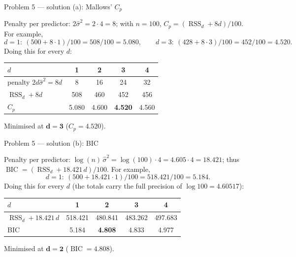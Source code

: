 \documentclass[aspectratio=169,11pt]{beamer}
\begin{document}
\begin{frame}{Problem 5 --- solution (a): Mallows' $C_p$}
  \begin{solutionbox}
    Penalty per predictor: $2\hat{\sigma}^2=2\cdot 4=8$; with $n=100$,
    $C_p=(\operatorname{RSS}_d+8d)/100$. For example,
    \[
      d=1:\ (500+8\cdot 1)/100=508/100=\mathbf{5.080},\qquad
      d=3:\ (428+8\cdot 3)/100=452/100=\mathbf{4.520}.
    \]
    Doing this for every $d$:
    \begin{center}
    \begin{tabular}{lcccc}
      \toprule
      $d$ & 1 & 2 & 3 & 4\\
      \midrule
      penalty $2d\hat{\sigma}^2=8d$ & 8 & 16 & 24 & 32\\
      $\operatorname{RSS}_d+8d$ & 508 & 460 & 452 & 456\\
      $C_p$ & 5.080 & 4.600 & \textbf{4.520} & 4.560\\
      \bottomrule
    \end{tabular}
    \end{center}
    Minimised at $\mathbf{d=3}$ ($C_p=4.520$).
  \end{solutionbox}
\end{frame}

\begin{frame}{Problem 5 --- solution (b): BIC}
  \begin{solutionbox}
    Penalty per predictor: $\log(n)\,\hat{\sigma}^2=\log(100)\cdot 4=4.605\cdot 4=18.421$;
    thus $\operatorname{BIC}=(\operatorname{RSS}_d+18.421\,d)/100$. For example,
    \[
      d=1:\ (500+18.421\cdot 1)/100=518.421/100=\mathbf{5.184}.
    \]
    Doing this for every $d$ (the totals carry the full precision of $\log 100=4.60517$):
    \begin{center}
    \begin{tabular}{lcccc}
      \toprule
      $d$ & 1 & 2 & 3 & 4\\
      \midrule
      $\operatorname{RSS}_d+18.421\,d$ & 518.421 & 480.841 & 483.262 & 497.683\\
      BIC & 5.184 & \textbf{4.808} & 4.833 & 4.977\\
      \bottomrule
    \end{tabular}
    \end{center}
    Minimised at $\mathbf{d=2}$ ($\operatorname{BIC}=4.808$).
  \end{solutionbox}
\end{frame}
\end{document}
